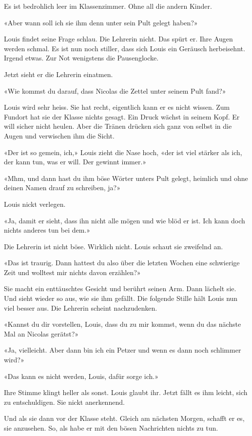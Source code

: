 Es ist bedrohlich leer im Klassenzimmer. Ohne all die andern Kinder.

«Aber wann soll ich sie ihm denn unter sein Pult gelegt haben?»

Louis findet seine Frage schlau. Die Lehrerin nicht. Das spürt er. Ihre
Augen werden schmal. Es ist nun noch stiller, dass sich Louis ein
Geräusch herbeisehnt. Irgend etwas. Zur Not wenigstens die Pausenglocke.

Jetzt sieht er die Lehrerin einatmen.

«Wie kommst du darauf, dass Nicolas die Zettel unter seinem Pult fand?»

Louis wird sehr heiss. Sie hat recht, eigentlich kann er es nicht
wissen. Zum Fundort hat sie der Klasse nichts gesagt. Ein Druck wächst
in seinem Kopf. Er will sicher nicht heulen. Aber die Tränen drücken
sich ganz von selbst in die Augen und verwischen ihm die Sicht.

«Der ist so gemein, ich,» Louis zieht die Nase hoch, «der ist viel
stärker als ich, der kann tun, was er will. Der gewinnt immer.»

«Mhm, und dann hast du ihm böse Wörter unters Pult gelegt, heimlich und
ohne deinen Namen drauf zu schreiben, ja?»

Louis nickt verlegen.

«Ja, damit er sieht, dass ihn nicht alle mögen und wie blöd er ist. Ich
kann doch nichts anderes tun bei dem.»

Die Lehrerin ist nicht böse. Wirklich nicht. Louis schaut sie zweifelnd
an.

«Das ist traurig. Dann hattest du also über die letzten Wochen eine
schwierige Zeit und wolltest mir nichts davon erzählen?»

Sie macht ein enttäuschtes Gesicht und berührt seinen Arm. Dann lächelt
sie. Und sieht wieder so aus, wie sie ihm gefällt. Die folgende Stille
hält Louis nun viel besser aus. Die Lehrerin scheint nachzudenken.

«Kannst du dir vorstellen, Louis, dass du zu mir kommst, wenn du das
nächste Mal an Nicolas gerätst?»

«Ja, vielleicht. Aber dann bin ich ein Petzer und wenn es dann noch
schlimmer wird?»

«Das kann es nicht werden, Louis, dafür sorge ich.»

Ihre Stimme klingt heller als sonst. Louis glaubt ihr. Jetzt fällt es
ihm leicht, sich zu entschuldigen. Sie nickt anerkennend.

Und als sie dann vor der Klasse steht. Gleich am nächsten Morgen,
schafft er es, sie anzusehen. So, als habe er mit den bösen Nachrichten
nichts zu tun.

